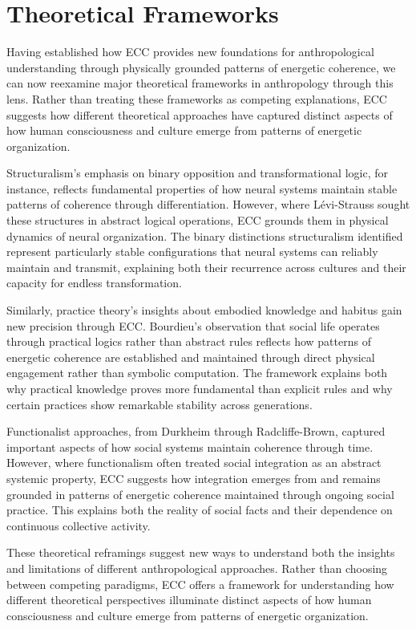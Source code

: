 \section{Theoretical Frameworks}

Having established how ECC provides new foundations for anthropological understanding through physically grounded patterns of energetic coherence, we can now reexamine major theoretical frameworks in anthropology through this lens. Rather than treating these frameworks as competing explanations, ECC suggests how different theoretical approaches have captured distinct aspects of how human consciousness and culture emerge from patterns of energetic organization.

Structuralism's emphasis on binary opposition and transformational logic, for instance, reflects fundamental properties of how neural systems maintain stable patterns of coherence through differentiation. However, where Lévi-Strauss sought these structures in abstract logical operations, ECC grounds them in physical dynamics of neural organization. The binary distinctions structuralism identified represent particularly stable configurations that neural systems can reliably maintain and transmit, explaining both their recurrence across cultures and their capacity for endless transformation.

Similarly, practice theory's insights about embodied knowledge and habitus gain new precision through ECC. Bourdieu's observation that social life operates through practical logics rather than abstract rules reflects how patterns of energetic coherence are established and maintained through direct physical engagement rather than symbolic computation. The framework explains both why practical knowledge proves more fundamental than explicit rules and why certain practices show remarkable stability across generations.

Functionalist approaches, from Durkheim through Radcliffe-Brown, captured important aspects of how social systems maintain coherence through time. However, where functionalism often treated social integration as an abstract systemic property, ECC suggests how integration emerges from and remains grounded in patterns of energetic coherence maintained through ongoing social practice. This explains both the reality of social facts and their dependence on continuous collective activity.

These theoretical reframings suggest new ways to understand both the insights and limitations of different anthropological approaches. Rather than choosing between competing paradigms, ECC offers a framework for understanding how different theoretical perspectives illuminate distinct aspects of how human consciousness and culture emerge from patterns of energetic organization.

